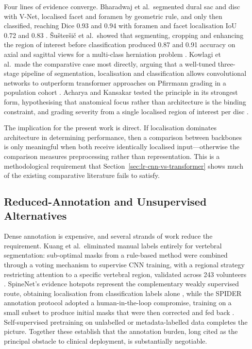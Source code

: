 Four lines of evidence converge. Bharadwaj et al.\ segmented dural sac and disc
with V-Net, localised facet and foramen by geometric rule, and only then
classified, reaching Dice 0.93 and 0.94 with foramen and facet localisation IoU
0.72 and 0.83 \cite{bharadwaj2023deep}. \v{S}u\v{s}ter\v{s}i\v{c} et al.\ showed
that segmenting, cropping and enhancing the region of interest before
classification produced 0.87 and 0.91 accuracy on axial and sagittal views for a
multi-class herniation problem \cite{sustersic2022a}. Kowlagi et al.\ made the
comparative case most directly, arguing that a well-tuned three-stage pipeline of
segmentation, localisation and classification allows convolutional networks to
outperform transformer approaches on Pfirrmann grading in a population cohort
\cite{kowlagi2022a}. Acharya and Kansakar tested the principle in its strongest
form, hypothesising that anatomical focus rather than architecture is the binding
constraint, and grading severity from a single localised region of interest per
disc \cite{acharya2026disccentric}.

The implication for the present work is direct. If localisation dominates
architecture in determining performance, then a comparison between backbones is
only meaningful when both receive identically localised input---otherwise the
comparison measures preprocessing rather than representation. This is a
methodological requirement that Section~\ref{sec:lr-cnn-vs-transformer} shows
much of the existing comparative literature fails to satisfy.

\subsection{Reduced-Annotation and Unsupervised Alternatives}
\label{sec:lr-weak-supervision}

Dense annotation is expensive, and several strands of work reduce the
requirement. Kuang et al.\ eliminated manual labels entirely for vertebral
segmentation: sub-optimal masks from a rule-based method were combined through a
voting mechanism to supervise CNN training, with a regional strategy restricting
attention to a specific vertebral region, validated across 243 volunteers
\cite{kuang2020mrisegflow}. SpineNet's evidence hotspots represent the
complementary weakly supervised route, obtaining localisation from
classification labels alone \cite{jamaludin2017spinenet}, while the SPIDER
annotation protocol adopted a human-in-the-loop compromise, training on a small
subset to produce initial masks that were then corrected and fed back
\cite{vandergraaf2024lumbar}. Self-supervised pretraining on unlabelled or
metadata-labelled data \cite{jamaludin2017selfsupervised} completes the picture.
Together these establish that the annotation burden, long cited as the principal
obstacle to clinical deployment, is substantially negotiable.

